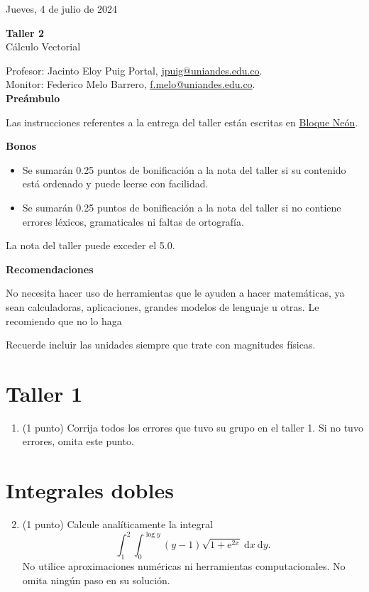 \documentclass{fmbvecto}
\renewcommand{\title}{Taller 2}
\newcommand{\subject}{Cálculo Vectorial}
\begin{document}
Jueves, 4 de julio de 2024

\begin{center}
    \textbf{\LARGE \title} \\
    {\large \subject}
\end{center}


Profesor: Jacinto Eloy Puig Portal, \href{mailto:jpuig@uniandes.edu.co}{jpuig@uniandes.edu.co}. \\
Monitor: Federico Melo Barrero, \href{mailto:f.melo@uniandes.edu.co}{f.melo@uniandes.edu.co}.\\

\textbf{\Large Preámbulo}

Las instrucciones referentes a la entrega del taller están escritas en \href{https://bloqueneon.uniandes.edu.co/d2l/home}{Bloque Neón}.

\textbf{Bonos}
\begin{itemize}
  \item Se sumarán 0.25 puntos de bonificación a la nota del taller si su contenido está ordenado y puede leerse con facilidad.
  \item Se sumarán 0.25 puntos de bonificación a la nota del taller si no contiene errores léxicos, gramaticales ni faltas de ortografía.
\end{itemize}
La nota del taller puede exceder el 5.0.

\textbf{Recomendaciones}

No necesita hacer uso de herramientas que le ayuden a hacer matemáticas, ya sean calculadoras, aplicaciones, grandes modelos de lenguaje u otras. Le recomiendo que no lo haga

Recuerde incluir las unidades siempre que trate con magnitudes físicas.

\section{Taller 1}

\begin{enumerate}
    \item (1 punto) Corrija todos los errores que tuvo su grupo en el taller 1. Si no tuvo errores, omita este punto.
\end{enumerate}

\section{Integrales dobles}

    \begin{enumerate}
        \setcounter{enumi}{1}
        \item (1 punto) Calcule analíticamente la integral \[ \int_{1}^{2} \int_{0}^{\log y} (y-1) \sqrt{1 + \mathrm{e}^{2x}} \: \mathrm{d}x \: \mathrm{d}y. \] No utilice aproximaciones numéricas ni herramientas computacionales. No omita ningún paso en su solución.
    \end{enumerate}
\end{document}
